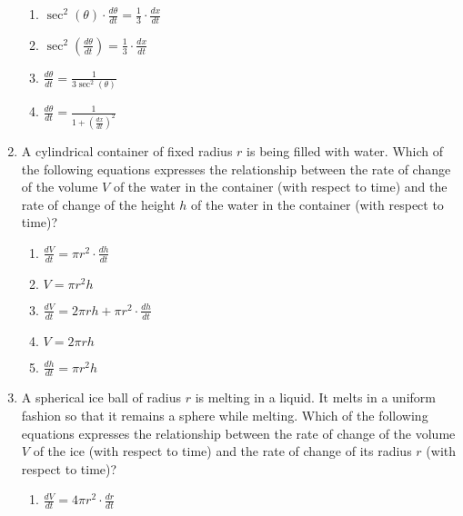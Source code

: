 \documentclass[12pt]{report}
\begin{document}
\begin{enumerate}
\begin{enumerate}
\item $\sec^2(\theta)\cdot \frac{d\theta}{dt} = \frac{1}{3}\cdot\frac{dx}{dt}$

\item $\sec^2\left(\frac{d\theta}{dt}\right) = \frac{1}{3}\cdot\frac{dx}{dt}$

\item $\frac{d\theta}{dt} = \frac{1}{3\sec^2\left(\theta\right)}$

\item $\frac{d\theta}{dt} = \frac{1}{1+\left(\frac{dx}{dt}\right)^2}$

\end{enumerate}

\pagebreak


\item A cylindrical container of fixed radius $r$ is being filled with water. Which of the following equations expresses the relationship between the rate of change of the volume $V$ of the water in the container (with respect to time) and the rate of change of the height $h$ of the water in the container (with respect to time)?

\begin{enumerate}

\item $\frac{dV}{dt}=\pi r^2\cdot \frac{dh}{dt}$

\item $V=\pi r^2 h$

\item $\frac{dV}{dt}=2\pi rh+\pi r^2\cdot \frac{dh}{dt}$

\item $V=2\pi r h$

\item $\frac{dh}{dt}=\pi r^2h$

\end{enumerate}

\item A spherical ice ball of radius $r$ is melting in a liquid. It melts in a uniform fashion so that it remains a sphere while melting. Which of the following equations expresses the relationship between the rate of change of the volume $V$ of the ice (with respect to time) and the rate of change of its radius $r$ (with respect to time)?

\begin{enumerate}

\item $\frac{dV}{dt}=4\pi r^2\cdot \frac{dr}{dt}$


\end{enumerate}
\end{enumerate}
\end{document}
